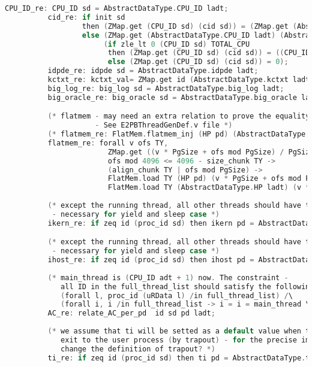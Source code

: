 \begin{lstlisting}[language=C]
          CPU_ID_re: CPU_ID sd = AbstractDataType.CPU_ID ladt;
          cid_re: if init sd
                  then (ZMap.get (CPU_ID sd) (cid sd)) = (ZMap.get (AbstractDataType.CPU_ID ladt) (AbstractDataType.cid ladt))
                  else (ZMap.get (AbstractDataType.CPU_ID ladt) (AbstractDataType.cid ladt)) = 0 /\
                       (if zle_lt 0 (CPU_ID sd) TOTAL_CPU
                        then (ZMap.get (CPU_ID sd) (cid sd)) = ((CPU_ID sd) + 1)
                        else (ZMap.get (CPU_ID sd) (cid sd)) = 0);
          idpde_re: idpde sd = AbstractDataType.idpde ladt;
          kctxt_re: kctxt_val= ZMap.get id (AbstractDataType.kctxt ladt);
          big_log_re: big_log sd = AbstractDataType.big_log ladt;
          big_oracle_re: big_oracle sd = AbstractDataType.big_oracle ladt;

          (* flatmem - may need an extra relation to prove the equality for load, store, and copy. 
                     - See E2PBThreadGenDef.v file *)
          (* flatmem_re: FlatMem.flatmem_inj (HP pd) (AbstractDataType.HP ladt); *)
          flatmem_re: forall v ofs TY,
                        ZMap.get ((v * PgSize + ofs mod PgSize) / PgSize) (pperm pd) = PGAlloc ->
                        ofs mod 4096 <= 4096 - size_chunk TY ->
                        (align_chunk TY | ofs mod PgSize) -> 
                        FlatMem.load TY (HP pd) (v * PgSize + ofs mod PgSize) =
                        FlatMem.load TY (AbstractDataType.HP ladt) (v * PgSize + ofs mod PgSize);
          
          (* except the running thread, all other threads should have the default value 
           - necessary for yield and sleep case *)
          ikern_re: if zeq id (proc_id sd) then ikern pd = AbstractDataType.ikern ladt else ikern pd = true;

          (* except the running thread, all other threads should have the default value 
           - necessary for yield and sleep case *)
          ihost_re: if zeq id (proc_id sd) then ihost pd = AbstractDataType.ihost ladt else ihost pd = true;
          
          (* main_thread is (CPU_ID adt + 1) now. The constraint - 
             all ID in the full_thread_list should satisfy the following constraint:
             (forall l, proc_id (uRData l) /in full_thread_list) /\ 
             (forall i, i /in full_thread_list -> i = i = main_thread \/ TOTAL_CPU < i < num_proc) *)
          AC_re: relate_AC_per_pd  id sd pd ladt;
           
          (* we assume that ti will be setted as a default value when the kernel 
             exit to the user process (by trapout) - for the precise implementation, we may need to 
             change the definition of trapout? *)
          ti_re: if zeq id (proc_id sd) then ti pd = AbstractDataType.ti ladt else  ti pd = init_trap_info;


\end{lstlisting}
